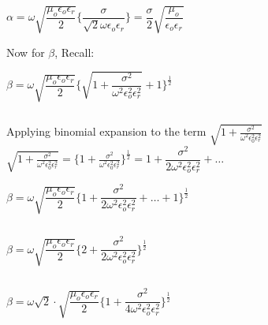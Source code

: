 \begin{center}
$\alpha = \omega\sqrt{\dfrac{\mu_{o}\epsilon_{o}\epsilon_{r}}{2}}\Bigg\{\dfrac{\sigma}{\sqrt{2}\omega\epsilon_{o}\epsilon_{r}}\Bigg\} =\dfrac{\sigma}{2}\sqrt{\dfrac{\mu_{o}}{\epsilon_{o}\epsilon_{r}}}$
\end{center}

Now for $\beta$, Recall:
\begin{center}
$\beta = \omega\sqrt{\dfrac{\mu_{o}\epsilon_{o}\epsilon_{r}}{2}}\Bigg\{{\sqrt{1 + \dfrac{\sigma^{2}}{\omega^{2}\epsilon_{o}^{2}\epsilon_{r}^{2}}}} + 1\Bigg\}^{\frac{1}{2}}$
\end{center}
\begin{equation}\end{equation}

Applying binomial expansion to the term $\sqrt{1 + \frac{\sigma^2}{\omega^2\epsilon_{0}^2\epsilon_{r}^2}}$\\

$\sqrt{1 + \frac{\sigma^2}{\omega^2\epsilon_{0}^2\epsilon_{r}^2}} = \bigg\{1 +\frac{\sigma^2}{\omega^2\epsilon_{0}^2\epsilon_{r}^2}\bigg\}^{\frac{1}{2}} = 1 + \dfrac{\sigma^{2}}{2\omega^{2}\epsilon_{o}^{2}\epsilon_{r}^{2}} + \dots$\\
\begin{equation}\end{equation}

\begin{center}
$\beta = \omega\sqrt{\dfrac{\mu_{o}\epsilon_{o}\epsilon_{r}}{2}}\Bigg\{1 + \dfrac{\sigma^{2}}{2\omega^{2}\epsilon_{o}^{2}\epsilon_{r}^{2}} + \dots + 1\Bigg\}^{\frac{1}{2}}$
\end{center}
\begin{equation}\end{equation}

\begin{center}
$\beta = \omega\sqrt{\dfrac{\mu_{o}\epsilon_{o}\epsilon_{r}}{2}}\Bigg\{2 + \dfrac{\sigma^{2}}{2\omega^{2}\epsilon_{o}^{2}\epsilon_{r}^{2}}\Bigg\}^{\frac{1}{2}}$
\end{center}
\begin{equation}\end{equation}

\begin{center}
$\beta = \omega\sqrt{2}\cdot\sqrt{\dfrac{\mu_{o}\epsilon_{o}\epsilon_{r}}{2}}\Bigg\{1 + \dfrac{\sigma^{2}}{4\omega^{2}\epsilon_{o}^{2}\epsilon_{r}^{2}}\Bigg\}^{\frac{1}{2}}$
\end{center}
\begin{equation}\end{equation}

